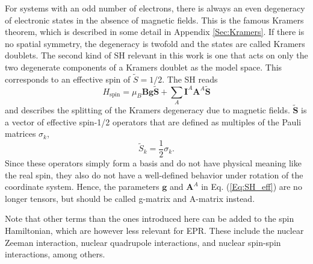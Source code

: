 For systems with an odd number of electrons, there is always an even degeneracy of electronic states in the absence of magnetic fields. This is the famous Kramers theorem, which is described in some detail in Appendix \ref{Sec:Kramers}. If there is no spatial symmetry, the degeneracy is twofold and the states are called Kramers doublets. The second kind of SH relevant in this work is one that acts on only the two degenerate components of a Kramers doublet as the model space. This corresponds to an effective spin of $\tilde{S}=1/2$. The SH reads
\begin{equation}
\label{Eq:SH_eff}
H_\text{spin} = \mu_B \mathbf{B}\mathbf{g}\tilde{\mathbf{S}} + \sum_A \mathbf{I}^A \mathbf{A}^A \tilde{\mathbf{S}}
\end{equation}
and describes the splitting of the Kramers degeneracy due to magnetic fields.
$\tilde {\mathbf{S}}$ is a vector of effective spin-1/2 operators that are defined as multiples of the Pauli matrices $\sigma_k$,
	\begin{equation}
	{\tilde S_k} = \frac{1}{2}{\sigma _k}.
	\end{equation}
Since these operators simply form a basis and do not have physical meaning like the real spin, they also do not have a well-defined behavior under rotation of the coordinate system. Hence, the parameters $\mathbf{g}$ and $\mathbf{A}^A$ in Eq. (\ref{Eq:SH_eff}) are no longer tensors, but should be called g-matrix and A-matrix instead.

Note that other terms than the ones introduced here can be added to the spin Hamiltonian, which are however less relevant for EPR. These include the nuclear Zeeman interaction, nuclear quadrupole interactions, and nuclear spin-spin interactions, among others.

